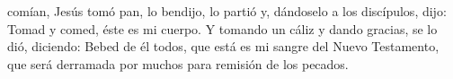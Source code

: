  comían, Jesús tomó pan, lo bendijo, lo partió y, dándoselo a los discípulos, dijo: Tomad y comed, éste es mi cuerpo. Y tomando un cáliz y dando gracias,
se lo dió, diciendo: Bebed de él todos, que está es mi sangre del Nuevo Testamento, que será derramada por muchos para remisión de los pecados.